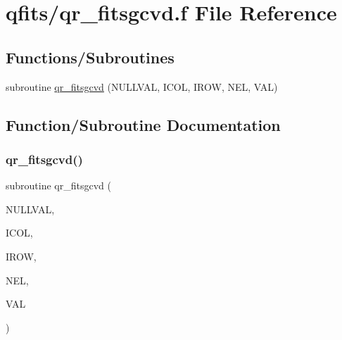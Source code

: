 \hypertarget{qr__fitsgcvd_8f}{}\section{qfits/qr\+\_\+fitsgcvd.f File Reference}
\label{qr__fitsgcvd_8f}
\subsection*{Functions/\+Subroutines}
\begin{DoxyCompactItemize}
\item 
subroutine \hyperlink{qr__fitsgcvd_8f_a489502f4bc1c6aee29c8dd542c07fd21}{qr\+\_\+fitsgcvd} (N\+U\+L\+L\+V\+AL, I\+C\+OL, I\+R\+OW, N\+EL, V\+AL)
\end{DoxyCompactItemize}


\subsection{Function/\+Subroutine Documentation}
\mbox{\label{qr__fitsgcvd_8f_a489502f4bc1c6aee29c8dd542c07fd21}} 
\subsubsection{\texorpdfstring{qr\+\_\+fitsgcvd()}{qr\_fitsgcvd()}}
{\footnotesize\ttfamily subroutine qr\+\_\+fitsgcvd (\begin{DoxyParamCaption}\item[{double precision}]{N\+U\+L\+L\+V\+AL,  }\item[{integer}]{I\+C\+OL,  }\item[{integer}]{I\+R\+OW,  }\item[{integer}]{N\+EL,  }\item[{double precision, dimension(nel)}]{V\+AL }\end{DoxyParamCaption})}

